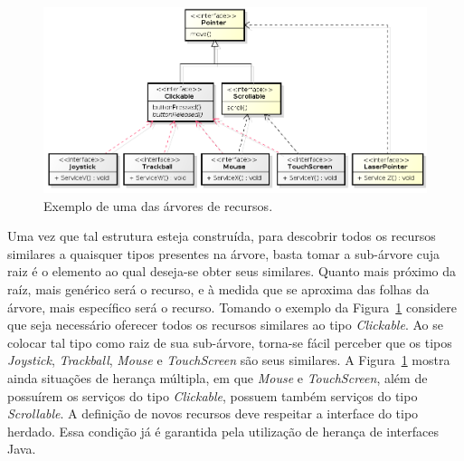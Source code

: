 \begin{figure}[ht]
	\center
	\includegraphics[scale=0.55]{imagens/arvoreDeRecursos}
	\caption{Exemplo de uma das árvores de recursos.}
	\label{fig:arvoreDeRecursos}
\end{figure}

Uma vez que tal estrutura esteja construída, para descobrir todos os recursos similares a quaisquer tipos presentes na árvore, basta tomar a sub-árvore cuja raiz é o elemento ao qual deseja-se obter seus similares. Quanto mais próximo da raíz, mais genérico será o recurso, e à medida que se aproxima das folhas da árvore, mais específico será o recurso. Tomando o exemplo da Figura~\ref{fig:arvoreDeRecursos} considere que seja necessário oferecer todos os recursos similares ao tipo \emph{Clickable}. Ao se colocar tal tipo como raiz de sua sub-árvore, torna-se fácil perceber que os tipos \emph{Joystick}, \emph{Trackball}, \emph{Mouse} e \emph{TouchScreen} são seus similares. A Figura~\ref{fig:arvoreDeRecursos} mostra ainda situações de herança múltipla, em que \emph{Mouse} e \emph{TouchScreen}, além de possuírem os serviços do tipo \emph{Clickable}, possuem também serviços do tipo \emph{Scrollable}. A definição de novos recursos deve respeitar a interface do tipo herdado. Essa condição já é garantida pela utilização de herança de interfaces Java.
